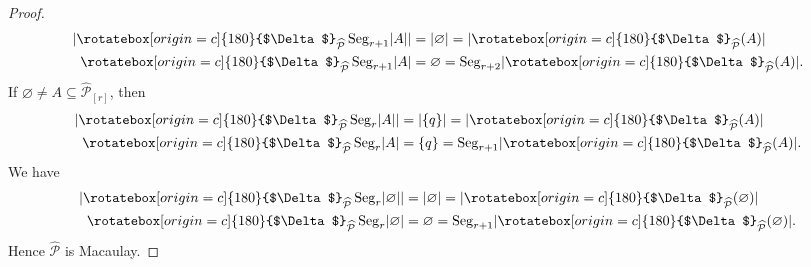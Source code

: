 \documentclass[11pt, reqno]{amsart}
\renewcommand{\P}{{\mathcal P}}
\newcommand{\uSdw}{\rotatebox[origin=c]{180}{$\Delta$}}
\def\Seg{\operatorname{Seg}}
\theoremstyle{plain} %
\theoremstyle{definition}
\theoremstyle{remark}
\numberwithin{equation}{section}  %
\begin{document}
\begin{proof}
\begin{align*}
\lvert \uSdw_{\widehat\P} \Seg_{r + 1} \lvert A \rvert \rvert &= \lvert \varnothing \rvert 
= \lvert \uSdw_{\widehat\P} (A)\rvert \\
\uSdw_{\widehat\P} \Seg_{r + 1} \lvert A \rvert &= \varnothing 
= \Seg_{r+2}\lvert\uSdw_{\widehat\P}(A)\rvert.
\end{align*}
If $\varnothing\neq A\subseteq\widehat\P_{[r]}$, then
\begin{align*}
\lvert\uSdw_{\widehat\P} \Seg_r\lvert A\rvert \rvert &= \lvert\{q\}\rvert 
= \lvert\uSdw_{\widehat\P}(A)\rvert \\ 
\uSdw_{\widehat\P}\Seg_r \lvert A\rvert &= \{q\} = \Seg_{r+1}\lvert\uSdw_{\widehat\P}(A)\rvert.
\end{align*}
We have
\begin{align*}
\lvert\uSdw_{\widehat\P} \Seg_r\lvert\varnothing\rvert \rvert &= \lvert\varnothing\rvert 
= \lvert\uSdw_{\widehat\P}(\varnothing)\rvert\ \\
\uSdw_{\widehat\P}\Seg_r \lvert \varnothing\rvert &= \varnothing 
= \Seg_{r+1}\lvert\uSdw_{\widehat\P}(\varnothing)\rvert.
\end{align*}
Hence $\widehat\P$ is Macaulay.
\end{proof}
\end{document}
